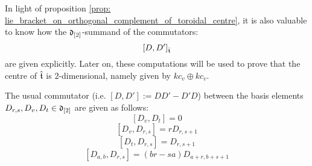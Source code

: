         In light of proposition \ref{prop: lie_bracket_on_orthogonal_complement_of_toroidal_centre}, it is also valuable to know how the $\mathfrak{d}_{[2]}$-summand of the commutators:
            $$[D, D']_{\hat{\mathfrak{t}}}$$
        are given explicitly. Later on, these computations will be used to prove that the centre of $\hat{\mathfrak{t}}$ is $2$-dimensional, namely given by $k c_v \oplus k c_v$.
        \begin{lemma} \label{lemma: explicit_commutators_between_basis_elements_of_toroidal_central_orthogonal_complement}
            The usual commutator (i.e. $[D, D'] := DD' - D'D$) between the basis elements $D_{r, s}, D_v, D_t \in \mathfrak{d}_{[2]}$ are given as follows:
                $$[D_v, D_t] = 0$$
                $$[D_v, D_{r, s}] = r D_{r, s + 1}$$
                $$[D_t, D_{r, s}] = D_{r, s + 1}$$
                $$[D_{a, b}, D_{r, s}] = (br - sa) D_{a + r, b + s + 1}$$
        \end{lemma}
